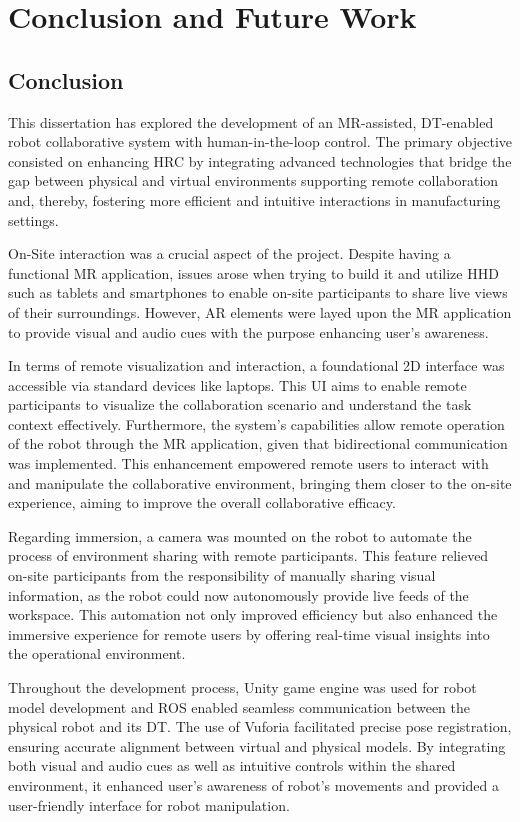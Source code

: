 \chapter{Conclusion and Future Work}%

\section{Conclusion}

This dissertation has explored the development of an \ac{MR}-assisted, \ac{DT}-enabled robot collaborative system with human-in-the-loop control. The primary objective consisted on enhancing \ac{HRC} by integrating advanced technologies that bridge the gap between physical and virtual environments supporting remote collaboration and, thereby, fostering more efficient and intuitive interactions in manufacturing settings.

On-Site interaction was a crucial aspect of the project. Despite having a functional \ac{MR} application, issues arose when trying to build it and utilize \ac{HHD} such as tablets and smartphones to enable on-site participants to share live views of their surroundings. However, \ac{AR} elements were layed upon the \ac{MR} application to provide visual and audio cues with the purpose enhancing user's awareness. 

In terms of remote visualization and interaction, a foundational 2D interface was accessible via standard devices like laptops. This \ac{UI} aims to enable remote participants to visualize the collaboration scenario and understand the task context effectively. Furthermore, the system's capabilities allow remote operation of the robot through the \ac{MR} application, given that bidirectional communication was implemented. This enhancement empowered remote users to interact with and manipulate the collaborative environment, bringing them closer to the on-site experience, aiming to improve the overall collaborative efficacy.

Regarding immersion, a camera was mounted on the robot to automate the process of environment sharing with remote participants. This feature relieved on-site participants from the responsibility of manually sharing visual information, as the robot could now autonomously provide live feeds of the workspace. This automation not only improved efficiency but also enhanced the immersive experience for remote users by offering real-time visual insights into the operational environment.

Throughout the development process, Unity game engine was used for robot model development and \ac{ROS} enabled seamless communication between the physical robot and its \ac{DT}. The use of Vuforia facilitated precise pose registration, ensuring accurate alignment between virtual and physical models. By integrating both visual and audio cues as well as intuitive controls within the shared environment, it enhanced user's awareness of robot's movements and provided a user-friendly interface for robot manipulation.

